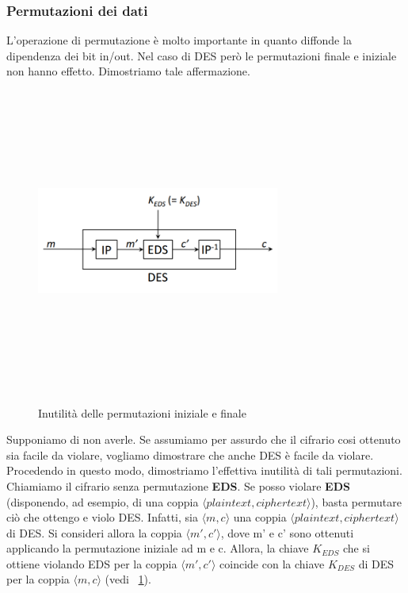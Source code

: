 \subsubsection{Permutazioni dei dati}
L'operazione di permutazione è molto importante in quanto diffonde la dipendenza dei bit in/out. Nel caso di DES però le permutazioni finale e iniziale non hanno effetto. Dimostriamo tale affermazione. \newline
\begin{figure}[htbp]
	\centering%
	\subfigure%
	{\includegraphics[height=10cm, width=8cm, keepaspectratio]{Immagini/chiave_segreta/des_perm_3.png}}
	\caption{Inutilità delle permutazioni iniziale e finale \label{fig:des_perm_3}} 	
\end{figure}
Supponiamo di non averle. Se assumiamo per assurdo che il cifrario cosi ottenuto sia facile da violare, vogliamo dimostrare che anche DES è facile da violare. Procedendo in questo modo, dimostriamo l'effettiva inutilità di tali permutazioni. \\

Chiamiamo il cifrario senza permutazione \textbf{EDS}. Se posso violare \textbf{EDS} (disponendo, ad esempio, di una coppia $\langle plaintext, ciphertext \rangle$), basta permutare ciò che ottengo e violo DES. Infatti, sia $\langle m, c \rangle$ una coppia $\langle plaintext, ciphertext \rangle$ di DES. Si consideri allora la coppia $\langle m', c' \rangle$, dove m' e c' sono ottenuti applicando la permutazione iniziale ad m e c. Allora, la chiave $K_{EDS}$ che si ottiene violando EDS per la
coppia $\langle m', c' \rangle$ coincide con la chiave $K_{DES}$ di DES per la
coppia $\langle m, c \rangle$ (vedi \figurename ~\ref{fig:des_perm_3}). \\

